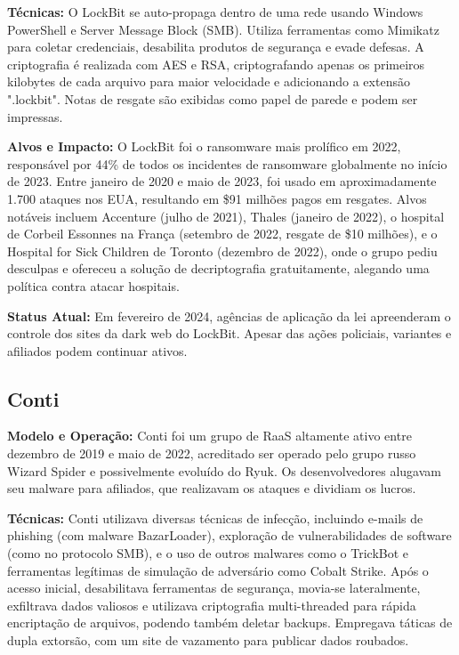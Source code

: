\textbf{Técnicas:} O LockBit se auto-propaga dentro de uma rede usando Windows PowerShell e Server Message Block (SMB). Utiliza ferramentas como Mimikatz para coletar credenciais, desabilita produtos de segurança e evade defesas. A criptografia é realizada com AES e RSA, criptografando apenas os primeiros kilobytes de cada arquivo para maior velocidade e adicionando a extensão ".lockbit". Notas de resgate são exibidas como papel de parede e podem ser impressas.

\textbf{Alvos e Impacto:} O LockBit foi o ransomware mais prolífico em 2022, responsável por 44\% de todos os incidentes de ransomware globalmente no início de 2023. Entre janeiro de 2020 e maio de 2023, foi usado em aproximadamente 1.700 ataques nos EUA, resultando em \$91 milhões pagos em resgates. Alvos notáveis incluem Accenture (julho de 2021), Thales (janeiro de 2022), o hospital de Corbeil Essonnes na França (setembro de 2022, resgate de \$10 milhões), e o Hospital for Sick Children de Toronto (dezembro de 2022), onde o grupo pediu desculpas e ofereceu a solução de decriptografia gratuitamente, alegando uma política contra atacar hospitais.

\textbf{Status Atual:} Em fevereiro de 2024, agências de aplicação da lei apreenderam o controle dos sites da dark web do LockBit. Apesar das ações policiais, variantes e afiliados podem continuar ativos.

\subsection{Conti}
\textbf{Modelo e Operação:} Conti foi um grupo de RaaS altamente ativo entre dezembro de 2019 e maio de 2022, acreditado ser operado pelo grupo russo Wizard Spider e possivelmente evoluído do Ryuk. Os desenvolvedores alugavam seu malware para afiliados, que realizavam os ataques e dividiam os lucros.

\textbf{Técnicas:} Conti utilizava diversas técnicas de infecção, incluindo e-mails de phishing (com malware BazarLoader), exploração de vulnerabilidades de software (como no protocolo SMB), e o uso de outros malwares como o TrickBot e ferramentas legítimas de simulação de adversário como Cobalt Strike. Após o acesso inicial, desabilitava ferramentas de segurança, movia-se lateralmente, exfiltrava dados valiosos e utilizava criptografia multi-threaded para rápida encriptação de arquivos, podendo também deletar backups. Empregava táticas de dupla extorsão, com um site de vazamento para publicar dados roubados.

